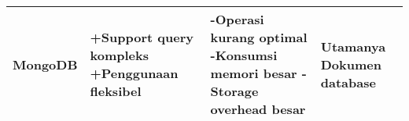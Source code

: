 \begin{table}[h]
{\begin{tabular}{|l|p{5cm}|p{5cm}|p{3cm}|}
			MongoDB                   & +Support query kompleks \newline +Penggunaan fleksibel                                                 & -Operasi kurang optimal \newline -Konsumsi memori besar \newline -Storage overhead besar                                                                                                                      & Utamanya Dokumen database              \\ \hline
		\end{tabular}
	}
	\label{tab:tools-db}
\end{table}
